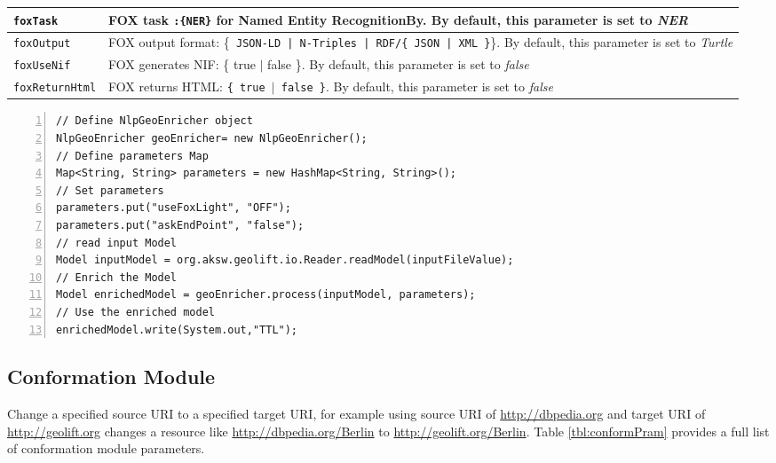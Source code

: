 \documentclass[a4paper,twoside,bibtotoc,abstracton,12pt,BCOR=15mm]{article}
\begin{document}
\begin{table}
\begin{tabularx}{\textwidth}{@{}lX@{}}
\midrule
\texttt{foxTask} 	& FOX task \texttt{:\{NER\}} for Named Entity RecognitionBy. By default, this parameter is set to \emph{NER}\\
\midrule
\texttt{foxOutput} 	& FOX output format: \{\texttt{ JSON-LD | N-Triples | RDF/\{ JSON | XML \}}\}. By default, this parameter is set to \emph{Turtle}\\
\midrule
\texttt{foxUseNif} 	& FOX generates NIF: \{ true $\rvert$ false \}. By default, this parameter is set to \emph{false}\\
\midrule
\texttt{foxReturnHtml} 	& FOX returns HTML: \texttt{\{ true $\rvert$ false \}}. By default, this parameter is set to \emph{false}\\ 
\bottomrule
\end{tabularx}
\end{table}

\begin{lstlisting}[label=lst:NlpGeoEnricher, numbers=left, numberstyle=\tiny, caption = Code fragment to call the \texttt{NlpGeoEnricher} class.]
// Define NlpGeoEnricher object
NlpGeoEnricher geoEnricher= new NlpGeoEnricher();
// Define parameters Map
Map<String, String> parameters = new HashMap<String, String>();
// Set parameters
parameters.put("useFoxLight", "OFF");
parameters.put("askEndPoint", "false");
// read input Model
Model inputModel = org.aksw.geolift.io.Reader.readModel(inputFileValue);
// Enrich the Model
Model enrichedModel = geoEnricher.process(inputModel, parameters);
// Use the enriched model
enrichedModel.write(System.out,"TTL");

\end{lstlisting}
 

\subsection{Conformation Module}
Change a specified source URI to a specified target URI, 
for example using source URI of \url{http://dbpedia.org} and target URI of \url{http://geolift.org} changes a resource like \url{http://dbpedia.org/Berlin} to \url{http://geolift.org/Berlin}.
Table \ref{tbl:conformPram} provides a full list of conformation module parameters.
\end{document}
